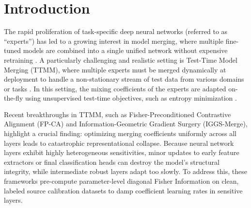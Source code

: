 \documentclass{article}
\theoremstyle{plain}
\theoremstyle{definition}
\theoremstyle{remark}
\begin{document}
\section{Introduction}
\label{submission-introduction}
The rapid proliferation of task-specific deep neural networks (referred to as ``experts'') has led to a growing interest in model merging, where multiple fine-tuned models are combined into a single unified network without expensive retraining \cite{ainsworth2022git, wortsman2022model, matena2022merging}. A particularly challenging and realistic setting is Test-Time Model Merging (TTMM), where multiple experts must be merged dynamically at deployment to handle a non-stationary stream of test data from various domains or tasks \cite{yang2024adamerging, zhao2024dynamic}. In this setting, the mixing coefficients of the experts are adapted on-the-fly using unsupervised test-time objectives, such as entropy minimization \cite{wang2021tent}.

Recent breakthroughs in TTMM, such as Fisher-Preconditioned Contrastive Alignment (FP-CA) and Information-Geometric Gradient Surgery (IGGS-Merge), highlight a crucial finding: optimizing merging coefficients uniformly across all layers leads to catastrophic representational collapse. Because neural network layers exhibit highly heterogeneous sensitivities, minor updates to early feature extractors or final classification heads can destroy the model's structural integrity, while intermediate robust layers adapt too slowly. To address this, these frameworks pre-compute parameter-level diagonal Fisher Information on clean, labeled source calibration datasets to damp coefficient learning rates in sensitive layers.
\end{document}
